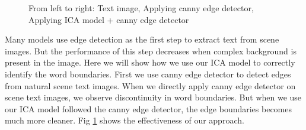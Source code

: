 \begin{figure}[t]
{}
\caption
{From left to right: Text image, Applying canny edge detector, Applying ICA model + canny edge detector}
\label{fig:edge}
\end{figure}
Many models \cite{chap4-6, chap4-7} use edge detection as the first step 
to extract text from scene images. But the performance of this step decreases when 
complex background is present in the image.  
Here we will show how we use our ICA model to correctly identify the word boundaries.
First we use canny edge detector \cite{chap4-5} to detect edges from natural scene text images. 
When we directly apply canny edge detector on scene text images, we observe discontinuity in word boundaries.
But when we use our ICA model followed the canny edge detector, the edge boundaries becomes much more cleaner.
Fig \ref{fig:edge} shows the effectiveness of our approach.


